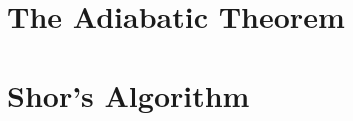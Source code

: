 \appendix
\chapter{The Adiabatic Theorem}
\label{apx:aqc}

\chapter{Shor's Algorithm}
\label{apx:shor}

